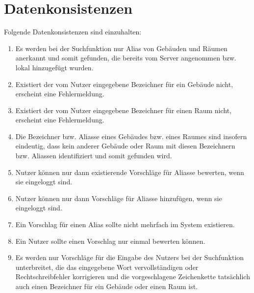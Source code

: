 \section{Datenkonsistenzen}

Folgende Datenkonsistenzen sind einzuhalten:
\begin{enumerate}[label=\textbf{/T\arabic*0/}, align=left, resume]
	\item Es werden bei der Suchfunktion nur Alias von Gebäuden und Räumen anerkannt und somit gefunden, die bereits vom Server angenommen bzw. lokal hinzugefügt wurden.
	\item Existiert der vom Nutzer eingegebene Bezeichner für ein Gebäude nicht, erscheint eine Fehlermeldung.
	\item Existiert der vom Nutzer eingegebene Bezeichner für einen Raum nicht, erscheint eine Fehlermeldung.
	\item Die Bezeichner bzw. Aliasse eines Gebäudes bzw. eines Raumes sind insofern eindeutig, dass kein anderer Gebäude oder Raum mit diesen Bezeichnern bzw. Aliassen identifiziert und somit gefunden wird.
	\item Nutzer können nur dann existierende Vorschläge für Aliasse bewerten, wenn sie eingeloggt sind.
	\item Nutzer können nur dann Vorschläge für Aliasse hinzufügen, wenn sie eingeloggt sind.
	\item Ein Vorschlag für einen Alias sollte nicht mehrfach im System existieren.
	\item Ein Nutzer sollte einen Vorschlag nur einmal bewerten können.
	\item Es werden nur Vorschläge für die Eingabe des Nutzers bei der Suchfunktion unterbreitet, die das eingegebene Wort vervollständigen oder Rechtschreibfehler korrigieren und die vorgeschlagene Zeichenkette tatsächlich auch einen Bezeichner für ein Gebäude oder einen Raum ist.
\end{enumerate}